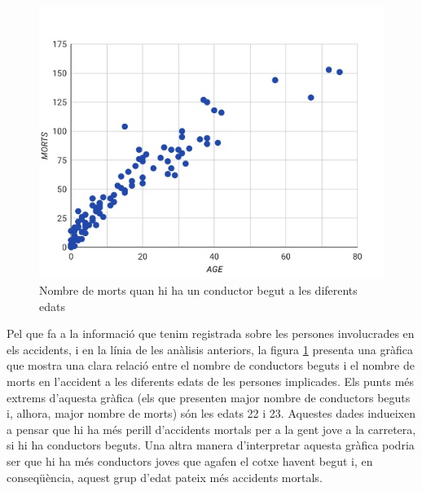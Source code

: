\documentclass[12pt,longbibliography]{article}
\theoremstyle{definition}
\theoremstyle{remark}
\begin{document}
\begin{figure}[H]
\begin{center}
\includegraphics[width=12.5cm]{Graph12}
\end{center}
\caption{Nombre de morts quan hi ha un conductor begut a les diferents edats}
\label{fig:G3}
\end{figure}


Pel que fa a la informació que tenim registrada sobre les persones involucrades en els accidents, i en la línia de les anàlisis anteriors, la figura  \ref{fig:G3} presenta una gràfica que mostra una clara relació entre el nombre de conductors beguts i el nombre de morts en l'accident a les diferents edats de les persones implicades. Els punts més extrems d'aquesta gràfica (els que presenten major nombre de conductors beguts i, alhora, major nombre de morts) són les edats 22 i 23. Aquestes dades indueixen a pensar que hi ha més perill d'accidents mortals per a la gent jove a la carretera, si hi ha conductors beguts. Una altra manera d'interpretar aquesta gràfica podria ser que hi ha més conductors joves que agafen el cotxe havent begut i, en conseqüència, aquest grup d'edat pateix més accidents mortals.
\end{document}
